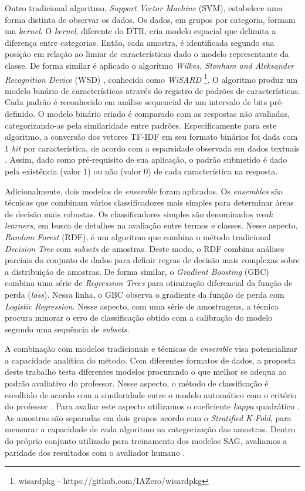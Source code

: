Outro tradicional algoritmo, \textit{Support Vector Machine} (SVM), estabelece uma forma distinta de observar os dados. Os dados, em grupos por categoria, formam um \textit{kernel}. O \textit{kernel}, diferente do DTR, cria modelo espacial que delimita a diferença entre categorias. Então, cada amostra, é identificada segundo sua posição em relação ao limiar de características dado o modelo representante da classe. De forma similar é aplicado o algoritmo \textit{Wilkes, Stonham and Aleksander Recognition Device} (WSD) \cite{aleksander1984, wisard2020}, conhecido como \textit{WiSARD} \footnote{wisardpkg - https://github.com/IAZero/wisardpkg}. O algoritmo produz um modelo binário de características através do registro de padrões de características. Cada padrão é reconhecido em análise sequencial de um intervalo de bits pré-definido. O modelo binário criado é comparado com as respostas não avaliadas, categorizando-as pela similaridade entre padrões. Especificamente para este algoritmo, a conversão dos vetores TF-IDF em seu formato binários foi dada com 1 \textit{bit} por característica, de acordo com a esparsidade observada em dados textuais \cite{manning1999}. Assim, dado como pré-requisito de sua aplicação, o padrão submetido é dado pela existência (valor 1) ou não (valor 0) de cada característica na resposta.

Adicionalmente, dois modelos de \textit{ensemble} foram aplicados. Os \textit{ensembles} são técnicas que combinam vários classificadores mais simples para determinar áreas de decisão mais robustas. Os classificadores simples são denominados \textit{weak learners}, em busca de detalhes na avaliação entre termos e classes. Nesse aspecto, \textit{Random Forest} (RDF), é um algoritmo que combina o método tradicional \textit{Decision Tree} com \textit{subsets} de amostras. Deste modo, o RDF combina análises parciais do conjunto de dados para definir regras de decisão mais complexas sobre a distribuição de amostras. De forma similar, o \textit{Gradient Boosting} (GBC) combina uma série de \textit{Regression Trees} para otimização diferencial da função de perda (\textit{loss}). Nessa linha, o GBC observa o gradiente da função de perda com \textit{Logistic Regression}. Nesse aspecto, com uma série de amostragens, a técnica procura minorar o erro de classificação obtido com a calibração do modelo segundo uma sequência de \textit{subsets}. 

A combinação com modelos tradicionais e técnicas de \textit{ensemble} visa potencializar a capacidade analítica do método. Com diferentes formatos de dados, a proposta deste trabalho testa diferentes modelos procurando o que melhor se adequa ao padrão avaliativo do professor. Nesse aspecto, o método de classificação é escolhido de acordo com a similaridade entre o modelo automático com o critério do professor \cite{pado2021}. Para avaliar este aspecto utilizamos o coeficiente \textit{kappa} quadrático \cite{cohen1960}. As amostras são separadas em dois grupos acordo com o \textit{Stratified K-Fold}, para mensurar a capacidade de cada algoritmo na categorização das amostras. Dentro do próprio conjunto utilizado para treinamento dos modelos SAG, avaliamos a paridade dos resultados com o avaliador humano \cite{artstein2008}.

